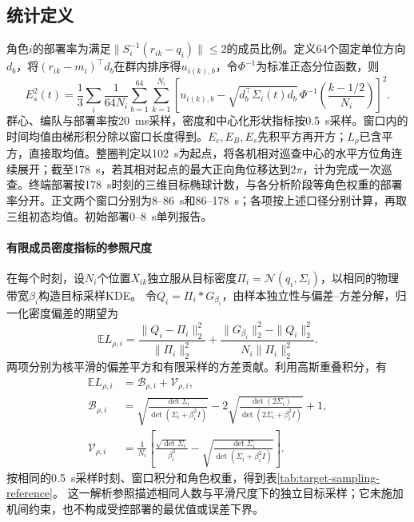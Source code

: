 \documentclass[UTF8,a4paper,11pt,fontset=none]{ctexart}
\begin{document}
\subsection{统计定义}\label{app:metrics}
角色$i$的部署率为满足$\|S_i^{-1}(r_{ik}-q_i)\|\le2$的成员比例。定义64个固定单位方向$d_b$，将$(r_{ik}-m_i)^\top d_b$在群内排序得$u_{i(k),b}$，令$\Phi^{-1}$为标准正态分位函数，则
\[
 E_s^2(t)=\frac13\sum_i\frac{1}{64N_i}\sum_{b=1}^{64}\sum_{k=1}^{N_i}
 \left[u_{i(k),b}-\sqrt{d_b^\top\Sigma_i(t)d_b}\,
     \Phi^{-1}\!\left(\frac{k-1/2}{N_i}\right)\right]^2 .
\]
群心、编队与部署率按20~ms采样，密度和中心化形状指标按0.5~s采样。窗口内的时间均值由梯形积分除以窗口长度得到。$E_c,E_B,E_s$先积平方再开方；$L_\rho$已含平方，直接取均值。整圈判定以102~s为起点，将各机相对巡查中心的水平方位角连续展开；截至178~s，若其相对起点的最大正向角位移达到$2\pi$，计为完成一次巡查。终端部署按178~s时刻的三维目标椭球计数，与各分析阶段等角色权重的部署率分开。正文两个窗口分别为8--86~s和86--178~s；各项按上述口径分别计算，再取三组初态均值。初始部署0--8~s单列报告。

\paragraph{有限成员密度指标的参照尺度}
在每个时刻，设$N_i$个位置$X_{ik}$独立服从目标密度$\Pi_i=\mathcal N(q_i,\Sigma_i)$，以相同的物理带宽$\beta_i$构造目标采样KDE。
令$Q_i=\Pi_i*G_{\beta_i}$，由样本独立性与偏差--方差分解，归一化密度偏差的期望为
\[
\mathbb E L_{\rho,i}
=\frac{\|Q_i-\Pi_i\|_2^2}{\|\Pi_i\|_2^2}
+\frac{\|G_{\beta_i}\|_2^2-\|Q_i\|_2^2}{N_i\|\Pi_i\|_2^2}.
\]
两项分别为核平滑的偏差平方和有限采样的方差贡献。利用高斯重叠积分，有
\begin{equation}
\begin{aligned}
\mathbb E L_{\rho,i}&=\mathcal B_{\rho,i}+\mathcal V_{\rho,i},\\
\mathcal B_{\rho,i}&=\sqrt{\frac{\det\Sigma_i}{\det(\Sigma_i+\beta_i^2I)}}
-2\sqrt{\frac{\det(2\Sigma_i)}{\det(2\Sigma_i+\beta_i^2I)}}+1,\\
\mathcal V_{\rho,i}&=\frac1{N_i}\left[\frac{\sqrt{\det\Sigma_i}}{\beta_i^3}
-\sqrt{\frac{\det\Sigma_i}{\det(\Sigma_i+\beta_i^2I)}}\right].
\end{aligned}
\label{eq:target-sampling-reference}
\end{equation}
按相同的0.5~s采样时刻、窗口积分和角色权重，得到表\ref{tab:target-sampling-reference}。
这一解析参照描述相同人数与平滑尺度下的独立目标采样；它未施加机间约束，也不构成受控部署的最优值或误差下界。
\end{document}

